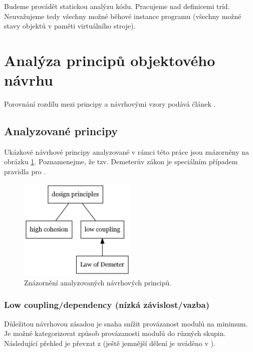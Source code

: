 
Budeme provádět statickou analýzu kódu. Pracujeme nad definicemi tríd. Neuvažujeme tedy všechny možné běhové instance programu (všechny možné stavy objektů v paměti virtuálního stroje).

\section{Analýza principů objektového návrhu}

Porovnání rozdílu mezi principy a návrhovými vzory podává článek \cite{612257}.

\subsection{Analyzované principy}
Ukázkové návrhové principy analyzované v rámci této práce jsou znázorněny na obrázku \ref{analyzed_principles}. Poznamenejme, že tzv. Demeterův zákon je speciálním případem pravidla pro .

\begin{figure}[h!]
  \centering
  \includegraphics[width=0.5\textwidth]{./graphs/oop_design_principles.png}
  \caption{Znázornění analyzovaných návrhových principů.\label{analyzed_principles}}
\end{figure}


\subsubsection{Low coupling/dependency (nízká závislost/vazba)}
Důležitou návrhovou zásadou je snaha snížit provázanost modulů na minimum. Je možné kategorizovat způsob provázanosti modulů do různých skupin. Následující přehled je převzat z \cite{wiki:coupling} (ještě jemnější dělení je uváděno v \cite{STVR:STVR162}).

